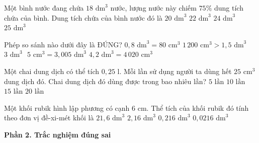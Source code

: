 \begin{ex} %
Một bình nước đang chứa $18\text{ dm}^3$ nước, lượng nước này chiếm $75\%$ dung tích chứa của bình. Dung tích chứa của bình nước đó là
\choice
{$20\text{ dm}^3$}
{$22\text{ dm}^3$}
{\True $24\text{ dm}^3$}
{$25\text{ dm}^3$}
\end{ex}

\begin{ex} %
Phép so sánh nào dưới đây là ĐÚNG?
\choice
{$0{,}8\text{ dm}^3 = 80\text{ cm}^3$}
{$1\,200\text{ cm}^3 > 1{,}5\text{ dm}^3$}
{\True $3\text{ dm}^3\text{ }5\text{ cm}^3 = 3{,}005\text{ dm}^3$}
{$4{,}2\text{ dm}^3 = 4\,020\text{ cm}^3$}
\end{ex}

\begin{ex} %
Một chai dung dịch có thể tích $0{,}25\text{ l}$. Mỗi lần sử dụng người ta dùng hết $25\text{ cm}^3$ dung dịch đó. Chai dung dịch đó dùng được trong bao nhiêu lần?
\choice
{$5\text{ lần}$}
{\True $10\text{ lần}$}
{$15\text{ lần}$}
{$20\text{ lần}$}
\end{ex}

\begin{ex} %
Một khối rubik hình lập phương có cạnh $6\text{ cm}$. Thể tích của khối rubik đó tính theo đơn vị đề-xi-mét khối là
\choice
{$21{,}6\text{ dm}^3$}
{$2{,}16\text{ dm}^3$}
{\True $0{,}216\text{ dm}^3$}
{$0{,}0216\text{ dm}^3$}
\end{ex}

\textbf{Phần 2. Trắc nghiệm đúng sai}

